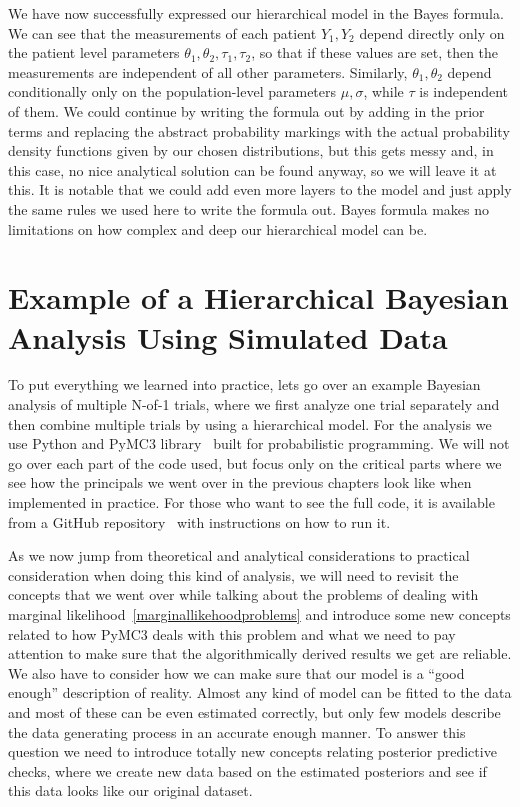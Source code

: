 \documentclass[12pt,a4paper,leqno]{report}
\theoremstyle{plain}
\theoremstyle{definition}
\theoremstyle{remark}
\begin{document}
We have now successfully expressed our hierarchical model in the Bayes formula.
We can see that the measurements of each patient \(Y_1, Y_2\) depend directly only on the patient
level parameters \(\theta_1, \theta_2, \tau_1, \tau_2\), so that if these values are set, then the
measurements are independent of all other parameters. Similarly, \(\theta_1, \theta_2 \) depend conditionally only
on the population-level parameters \(\mu, \sigma \), while \(\tau \) is independent of
them. We could continue by writing the
formula out by adding in the prior terms and replacing the abstract probability
markings with the actual probability density functions given by our chosen
distributions, but this gets messy and, in this case, no nice analytical solution can be
found anyway, so we will leave it at this. It is notable that we could add even
more layers to the model and just apply the same rules we used here to write the formula
out. Bayes formula makes no limitations on how complex and deep our hierarchical model
can be.

\chapter{Example of a Hierarchical Bayesian Analysis Using Simulated Data}

To put everything we learned into practice, lets go over an example Bayesian
analysis of multiple N-of-1 trials, where we first analyze one trial separately and then
combine multiple trials by using a hierarchical model. For the analysis we use Python and PyMC3 library\ \cite{pymc3} built
for probabilistic programming. We will not go over each part of the code used, but focus only
on the critical parts where we see how the principals we went over in the
previous chapters look like when implemented in practice. For those who want to see the
full code, it is available from a GitHub repository\ \cite{github} with instructions on how
to run it.

As we now jump from theoretical and analytical considerations to practical consideration
when doing this kind of analysis, we will need to revisit the concepts that we went over
while talking about the problems of dealing with marginal likelihood\
\ref{marginallikehoodproblems} and introduce some new concepts related to how
PyMC3 deals with this problem and what we need to pay attention to
make sure that the algorithmically derived results we get are reliable. We also have to
consider how we can make sure that our model is a ``good enough'' description of reality.
Almost any kind of model can be fitted to the data and most of these can be even
estimated correctly, but only few models describe the data generating process in an
accurate enough manner. To answer this question we need to introduce totally new concepts
relating posterior predictive checks, where we create new data based on the estimated
posteriors and see if this data looks like our original dataset.
\end{document}
